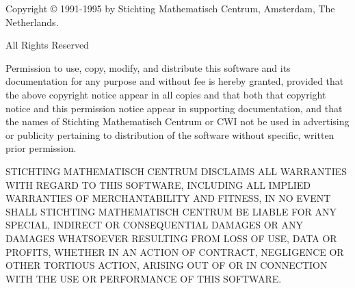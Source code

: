 Copyright \copyright{} 1991-1995 by Stichting Mathematisch Centrum,
Amsterdam, The Netherlands.

\begin{center}
All Rights Reserved
\end{center}

Permission to use, copy, modify, and distribute this software and its
documentation for any purpose and without fee is hereby granted,
provided that the above copyright notice appear in all copies and that
both that copyright notice and this permission notice appear in
supporting documentation, and that the names of Stichting Mathematisch
Centrum or CWI not be used in advertising or publicity pertaining to
distribution of the software without specific, written prior permission.

STICHTING MATHEMATISCH CENTRUM DISCLAIMS ALL WARRANTIES WITH REGARD TO
THIS SOFTWARE, INCLUDING ALL IMPLIED WARRANTIES OF MERCHANTABILITY AND
FITNESS, IN NO EVENT SHALL STICHTING MATHEMATISCH CENTRUM BE LIABLE
FOR ANY SPECIAL, INDIRECT OR CONSEQUENTIAL DAMAGES OR ANY DAMAGES
WHATSOEVER RESULTING FROM LOSS OF USE, DATA OR PROFITS, WHETHER IN AN
ACTION OF CONTRACT, NEGLIGENCE OR OTHER TORTIOUS ACTION, ARISING OUT
OF OR IN CONNECTION WITH THE USE OR PERFORMANCE OF THIS SOFTWARE.
